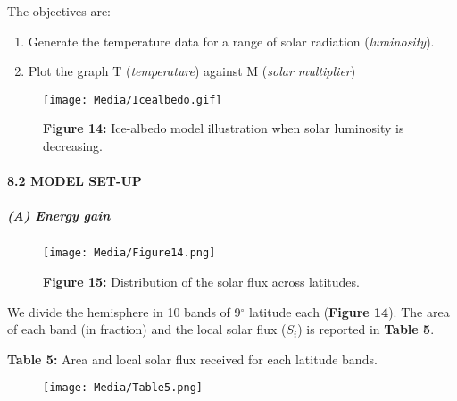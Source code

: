 \documentclass[
  letterpaper,
  DIV=11,
  numbers=noendperiod]{scrartcl}
\let\oldparagraph\paragraph
\renewcommand{\paragraph}[1]{\oldparagraph{#1}\mbox{}}
\let\oldsubparagraph\subparagraph
\renewcommand{\subparagraph}[1]{\oldsubparagraph{#1}\mbox{}}
\providecommand{\tightlist}{%
  \setlength{\itemsep}{0pt}\setlength{\parskip}{0pt}}\usepackage{longtable,booktabs,array}
\begin{document}
The objectives are:

\begin{enumerate}
\def\labelenumi{\arabic{enumi}.}
\tightlist
\item
  Generate the temperature data for a range of solar radiation
  (\emph{luminosity}).
\item
  Plot the graph T (\emph{temperature}) against M (\emph{solar
  multiplier})
\end{enumerate}

\begin{figure}

{\centering \texttt{[image: Media/Icealbedo.gif]}

}

\caption{\textbf{Figure 14:} Ice-albedo model illustration when solar
luminosity is decreasing.}

\end{figure}

\hypertarget{model-set-up}{%
\paragraph{8.2 MODEL SET-UP}\label{model-set-up}}

\hypertarget{a-energy-gain}{%
\subparagraph{(A) Energy gain}\label{a-energy-gain}}

\begin{figure}

{\centering \texttt{[image: Media/Figure14.png]}

}

\caption{\textbf{Figure 15:} Distribution of the solar flux across
latitudes.}

\end{figure}

We divide the hemisphere in 10 bands of 9\(^\circ\) latitude each
(\textbf{Figure 14}). The area of each band (in fraction) and the local
solar flux (\(S_i\)) is reported in \textbf{Table 5}.

\textbf{Table 5:} Area and local solar flux received for each latitude
bands.

\begin{figure}

{\centering \texttt{[image: Media/Table5.png]}

}

\end{figure}
\end{document}
